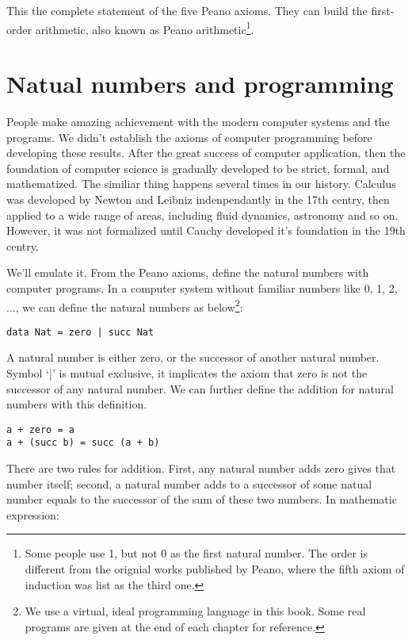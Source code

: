 \documentclass[UTF8]{article}
\begin{document}
This the complete statement of the five Peano axioms. They can build the first-order arithmetic, also known as Peano arithmetic\footnote{Some people use 1, but not 0 as the first natural number. The order is different from the orignial works published by Peano, where the fifth axiom of induction was list as the third one.}.

\section{Natual numbers and programming}

People make amazing achievement with the modern computer systems and the programs. We didn't establish the axioms of computer programming before developing these results. After the great success of computer application, then the foundation of computer science is gradually developed to be strict, formal, and mathematized. The similiar thing happens several times in our history. Calculus was developed by Newton and Leibniz indenpendantly in the 17th centry, then applied to a wide range of areas, including fluid dynamics, astronomy and so on. However, it was not formalized until Cauchy developed it's foundation in the 19th centry.

We'll emulate it. From the Peano axioms, define the natural numbers with computer programs. In a computer system without familiar numbers like 0, 1, 2, ..., we can define the natural numbers as below\footnote{We use a virtual, ideal programming language in this book. Some real programs are given at the end of each chapter for reference.}:

\lstset{language=Haskell}
\begin{lstlisting}
data Nat = zero | succ Nat
\end{lstlisting}


A natural number is either zero, or the successor of another natural number. Symbol `|' is mutual exclusive, it implicates the axiom that zero is not the successor of any natural number. We can further define the addition for natural numbers with this definition.

\begin{lstlisting}
a + zero = a
a + (succ b) = succ (a + b)
\end{lstlisting}

There are two rules for addition. First, any natural number adds zero gives that number itself; second, a natural number adds to a successor of some natual number equals to the successor of the sum of these two numbers. In mathematic expression:
\end{document}
